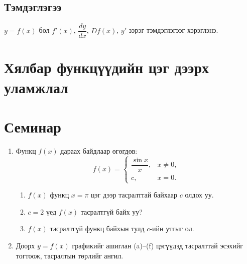 \subsection*{Тэмдэглэгээ}
$y=f(x)$ бол $f'(x)$, $\dfrac{dy}{dx}$, $Df(x)$, $y'$ зэрэг тэмдэглэгээг хэрэглэнэ.
\section{Хялбар функцүүдийн цэг дээрх уламжлал}

\section{Семинар}
\begin{enumerate}
    \item Функц $f(x)$ дараах байдлаар өгөгдөв:
\[
f(x)=
\begin{cases}
\dfrac{\sin x}{x}, & x\ne 0,\\[1ex]
c, & x=0.
\end{cases}
\]
\begin{enumerate}[label=\alph*)]
    \item $f(x)$ функц $x=\pi$ цэг дээр тасралттай  байхаар $c$ олдох уу.
    \item $c=2$ үед $f(x)$ тасралтгүй байх уу?
    \item $f(x)$ тасралтгүй функц байхын тулд $c$-ийн утгыг ол.
\end{enumerate}
\item Доорх $y=f(x)$ графикийг ашиглан (a)–(f) цэгүүдэд тасралттай эсэхийг тогтоож, тасралтын төрлийг ангил.
\begin{center}
\end{center}
\end{enumerate}
